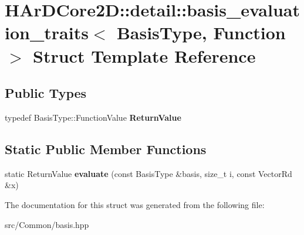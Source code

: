 \hypertarget{structHArDCore2D_1_1detail_1_1basis__evaluation__traits_3_01BasisType_00_01Function_01_4}{}\section{H\+Ar\+D\+Core2D\+:\+:detail\+:\+:basis\+\_\+evaluation\+\_\+traits$<$ Basis\+Type, Function $>$ Struct Template Reference}
\label{structHArDCore2D_1_1detail_1_1basis__evaluation__traits_3_01BasisType_00_01Function_01_4}
\subsection*{Public Types}
\begin{DoxyCompactItemize}
\item 
\mbox{\label{structHArDCore2D_1_1detail_1_1basis__evaluation__traits_3_01BasisType_00_01Function_01_4_a169e5809bf5bdd0b38087e155398861e}} 
typedef Basis\+Type\+::\+Function\+Value {\bfseries Return\+Value}
\end{DoxyCompactItemize}
\subsection*{Static Public Member Functions}
\begin{DoxyCompactItemize}
\item 
\mbox{\label{structHArDCore2D_1_1detail_1_1basis__evaluation__traits_3_01BasisType_00_01Function_01_4_ad1b1bedb394bfa0843347da693760691}} 
static Return\+Value {\bfseries evaluate} (const Basis\+Type \&basis, size\+\_\+t i, const Vector\+Rd \&x)
\end{DoxyCompactItemize}


The documentation for this struct was generated from the following file\+:\begin{DoxyCompactItemize}
\item 
src/\+Common/basis.\+hpp\end{DoxyCompactItemize}

